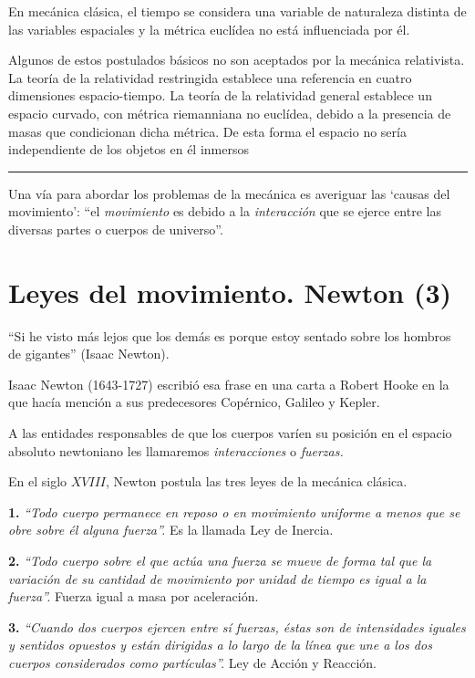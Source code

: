 \setlength{\parindent}{0pt} %
En mecánica clásica, el tiempo se considera una variable de naturaleza distinta de las variables espaciales y la métrica euclídea no está influenciada por él. 

Algunos de estos postulados básicos no son aceptados por la mecánica relativista. La teoría de la relatividad restringida establece una referencia en cuatro dimensiones espacio-tiempo. La teoría de la relatividad general establece un espacio curvado, con métrica riemanniana no euclídea, debido a la presencia de masas que condicionan dicha métrica. De esta forma el espacio no sería independiente de los objetos en él inmersos 

\rule{150pt}{0.4pt} 

Una vía para abordar los problemas de la mecánica es averiguar las `causas del movimiento': ``el \emph{movimiento} es debido a la \emph{interacción} que se ejerce entre las diversas partes o cuerpos de universo''.


\section{Leyes del movimiento. Newton (3)}

\begin{cita}
``Si he visto más lejos que los demás es porque estoy sentado sobre los hombros de gigantes'' (Isaac Newton).
\end{cita} 

\vspace{-13mm}\scriptsize{Isaac Newton (1643-1727) escribió esa frase en una carta a Robert Hooke en la que hacía mención a sus predecesores Copérnico, Galileo y Kepler}\normalsize{.}

\vspace{4mm}A las entidades responsables de que los cuerpos varíen su posición en el espacio absoluto newtoniano les llamaremos \emph{interacciones} o \emph{fuerzas.}

En el siglo $XVIII$, Newton postula las tres leyes de la mecánica clásica.

\vspace{3mm}
\begin{miparrafo}

\textbf{1. } \emph{``Todo cuerpo permanece en reposo o en movimiento uniforme a menos que se obre sobre él alguna fuerza''.} Es la llamada \textsf{Ley de Inercia.}

\textbf{2. } \emph{``Todo cuerpo sobre el que actúa una fuerza se mueve de forma tal que la variación de su cantidad de movimiento por unidad de tiempo es igual a la fuerza''.} \textsf{Fuerza igual a masa por aceleración.}

\textbf{3. } \emph{``Cuando dos cuerpos ejercen entre sí fuerzas, éstas son de intensidades iguales y sentidos opuestos y están dirigidas a lo largo de la línea que une a los dos cuerpos considerados como partículas''.} 
\textsf{Ley de Acción y Reacción.}

\end{miparrafo}

